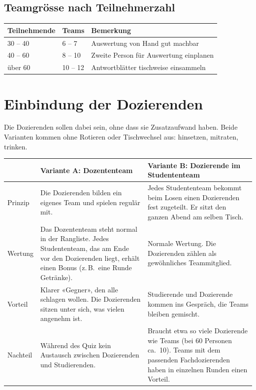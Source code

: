 \documentclass[a4paper,11pt]{article}
\begin{document}
\subsection{Teamgrösse nach Teilnehmerzahl}
\begin{tabularx}{\textwidth}{@{}l l X@{}}
\toprule
\textbf{Teilnehmende} & \textbf{Teams} & \textbf{Bemerkung} \\
\midrule
30 -- 40 & 6 -- 7 & Auswertung von Hand gut machbar \\
40 -- 60 & 8 -- 10 & Zweite Person für Auswertung einplanen \\
über 60 & 10 -- 12 & Antwortblätter tischweise einsammeln \\
\bottomrule
\end{tabularx}


\section{Einbindung der Dozierenden}
Die Dozierenden sollen dabei sein, ohne dass sie Zusatzaufwand haben. Beide Varianten kommen ohne Rotieren oder Tischwechsel aus: hinsetzen, mitraten, trinken.

\medskip
\noindent\begin{tabularx}{\textwidth}{@{}>{\raggedright\arraybackslash}p{2.2cm} >{\raggedright\arraybackslash}X >{\raggedright\arraybackslash}X@{}}
\toprule
 & \textbf{Variante A: Dozententeam} & \textbf{Variante B: Dozierende im Studententeam} \\
\midrule
Prinzip & Die Dozierenden bilden ein eigenes Team und spielen regulär mit. & Jedes Studententeam bekommt beim Losen einen Dozierenden fest zugeteilt. Er sitzt den ganzen Abend am selben Tisch. \\[0.3em]
Wertung & Das Dozententeam steht normal in der Rangliste. Jedes Studententeam, das am Ende vor den Dozierenden liegt, erhält einen Bonus (z.\,B.\ eine Runde Getränke). & Normale Wertung. Die Dozierenden zählen als gewöhnliches Teammitglied. \\[0.3em]
Vorteil & Klarer «Gegner», den alle schlagen wollen. Die Dozierenden sitzen unter sich, was vielen angenehm ist. & Studierende und Dozierende kommen ins Gespräch, die Teams bleiben gemischt. \\[0.3em]
Nachteil & Während des Quiz kein Austausch zwischen Dozierenden und Studierenden. & Braucht etwa so viele Dozierende wie Teams (bei 60 Personen ca.\ 10). Teams mit dem passenden Fachdozierenden haben in einzelnen Runden einen Vorteil. \\
\bottomrule
\end{tabularx}
\end{document}
